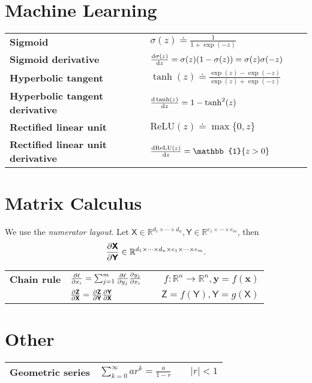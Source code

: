 \documentclass{article}
\newcommand{\R}{\mathbb{R}}
\renewcommand{\vec}[1]{\bm{#1}}
\newcommand{\tens}[1]{\bm{\mathsf{#1}}}
\begin{document}
\section*{Machine Learning}

\begin{xltabular}{\textwidth}{@{}llXr@{}}
    \toprule
    \textbf{Sigmoid}                          & $\sigma(z) \doteq \frac{1}{1 + \exp(-z)}$                               & & \\
    \textbf{Sigmoid derivative}               & $\odv{\sigma(z)}{z} = \sigma(z) (1 - \sigma(z)) = \sigma(z) \sigma(-z)$ & & \\
    \textbf{Hyperbolic tangent}               & $\tanh(z) \doteq \frac{\exp(z) - \exp(-z)}{\exp(z) + \exp(-z)}$         & & \\
    \textbf{Hyperbolic tangent derivative}    & $\odv{\tanh(z)}{z} = 1 - \tanh^2(z)$                                    & & \\
    \textbf{Rectified linear unit}            & $\mathrm{ReLU}(z) \doteq \max \{ 0, z \}$                               & & \\
    \textbf{Rectified linear unit derivative} & $\odv{\mathrm{ReLU}(z)}{z} = \mathbb{1} \{ z > 0 \}$                    & & \\
    \bottomrule
\end{xltabular}

\section*{Matrix Calculus}

We use the \textit{numerator layout}. Let $\tens{X} \in \R^{d_1 \times \cdots \times d_n}, \tens{Y}
    \in \R^{e_1 \times \cdots \times e_m}$, then \[
    \pdv{\tens{X}}{\tens{Y}} \in \R^{d_1 \times \cdots \times d_n \times e_1 \times \cdots \times e_m}.
\]

\begin{xltabular}{\textwidth}{@{}llXr@{}}
    \toprule
    \textbf{Chain rule} & $\pdv{\ell}{x_i} = \sum_{j=1}^{m} \pdv{\ell}{y_j} \pdv{y_j}{x_i}$ & & $f: \R^n \to \R^n, \vec{y} = f(\vec{x})$ \\
    & $\pdv{\tens{Z}}{\tens{X}} = \pdv{\tens{Z}}{\tens{Y}} \pdv{\tens{Y}}{\tens{X}}$ & & $\tens{Z} = f(\tens{Y}), \tens{Y} = g(\tens{X})$ \\
    \bottomrule
\end{xltabular}

\section*{Other}

\begin{xltabular}{\textwidth}{@{}llXr@{}}
    \toprule
    \textbf{Geometric series} & $\sum_{k=0}^{\infty} ar^k = \frac{a}{1-r}$ & & $|r| < 1$ \\
    \bottomrule
\end{xltabular}
\end{document}
